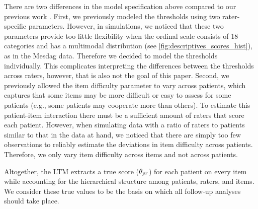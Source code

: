 \documentclass[a4paper,11pt]{article}
\newcommand{\DB}[1]{\todo[inline, color=colorDon,caption={}]{DB: {#1}}}
\begin{document}
There are two differences in the model specification above compared to our previous work \parencite{vandenBergh2020cultural}.
First, we previously modeled the thresholds using two rater-specific parameters.
However, in simulations, we noticed that these two parameters provide too little flexibility when the ordinal scale consists of 18 categories and has a multimodal distribution (see \autoref{fig:descriptives_scores_hist}), as in the Mesdag data.
Therefore we decided to model the thresholds individually.
This complicates interpreting the differences between the thresholds across raters, however, that is also not the goal of this paper.
Second, we previously allowed the item difficulty parameter to vary across patients, which captures that some items may be more difficult or easy to assess for some patients (e.g., some patients may cooperate more than others).
To estimate this patient-item interaction there must be a sufficient amount of raters that score each patient.
However, when simulating data with a ratio of raters to patients similar to that in the data at hand, we noticed that there are simply too few observations to reliably estimate the deviations in item difficulty across patients.
Therefore, we only vary item difficulty across items and not across patients.

Altogether, the LTM extracts a true score ($\theta_{pr}$) for each patient on every item while accounting for the hierarchical structure among patients, raters, and items.
We consider these true values to be the basis on which all follow-up analyses should take place.%



%
%
%
%
%
\end{document}
